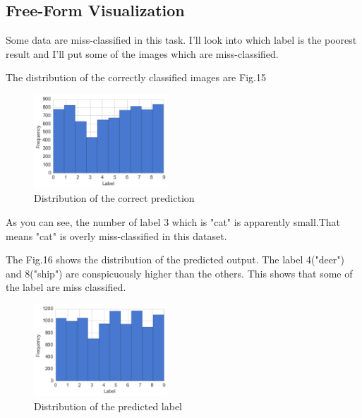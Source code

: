 \subsection{Free-Form Visualization}
Some data are miss-classified in this task. I'll look into which label is the poorest result and I'll put some of the images which are miss-classified.

The distribution of the correctly classified images are Fig.15

\begin{figure}[H]

	\begin{center}
	\includegraphics[width=5cm]{picture/label_correct.png}
	\caption{Distribution of the correct prediction}
	\end{center}
	\label{fig:15}

\end{figure}

As you can see, the number of label 3 which is "cat" is apparently small.That means "cat" is overly miss-classified in this dataset.

The Fig.16 shows the distribution of the predicted output. The label 4("deer") and 8("ship") are conspicuously higher than the others. This shows that some of the label are miss classified.

\begin{figure}[H]

	\begin{center}
	\includegraphics[width=5cm]{picture/output.png}
	\caption{Distribution of the predicted label}
	\end{center}
	\label{fig:16}

\end{figure}





